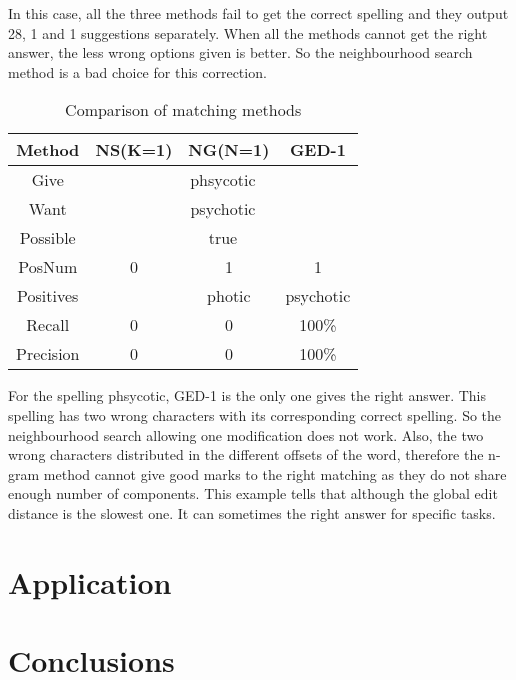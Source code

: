 \documentclass[11pt]{article}
\begin{document}
In this case, all the three methods fail to get the correct spelling and they output 28, 1 and 1 suggestions separately. When all the methods cannot get the right answer, the less wrong options given is better. So the neighbourhood search method is a bad choice for this correction.  

\begin{table}[h]
 \begin{center}
\begin{tabular}{ |c||c|c|c| }
      \hline
      Method & NS(K=1) & NG(N=1) & GED-1\\
      \hline
      Give & \multicolumn{3}{|c|}{phsycotic}\\
      Want & \multicolumn{3}{|c|}{psychotic}\\
      Possible & \multicolumn{3}{|c|}{true}\\
      \hline
      PosNum & 0 & 1 & 1\\
      Positives &  & photic & psychotic \\
      Recall & 0 & 0 & 100\%\\
      Precision & 0 & 0 & 100\%\\
      \hline
      \hline
\end{tabular}
\caption{Comparison of matching methods}\label{table7}
 \end{center}
\end{table}

For the spelling phsycotic, GED-1 is the only one gives the right answer. This spelling has two wrong characters with its corresponding correct spelling. So the neighbourhood search allowing one modification does not work. Also, the two wrong characters distributed in the different offsets of the word, therefore the n-gram method cannot give good marks to the right matching as they do not share enough number of components. This example tells that although the global edit distance is the slowest one. It can sometimes the right answer for specific tasks. 

\section{Application}


\section{Conclusions}





\end{document}
